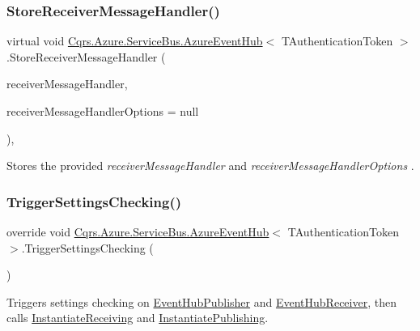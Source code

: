 \subsubsection{\texorpdfstring{Store\+Receiver\+Message\+Handler()}{StoreReceiverMessageHandler()}}
{\footnotesize\ttfamily virtual void \hyperlink{classCqrs_1_1Azure_1_1ServiceBus_1_1AzureEventHub}{Cqrs.\+Azure.\+Service\+Bus.\+Azure\+Event\+Hub}$<$ T\+Authentication\+Token $>$.Store\+Receiver\+Message\+Handler (\begin{DoxyParamCaption}\item[{Action$<$ Partition\+Context, Event\+Data $>$}]{receiver\+Message\+Handler,  }\item[{Event\+Processor\+Options}]{receiver\+Message\+Handler\+Options = {\ttfamily null} }\end{DoxyParamCaption})\hspace{0.3cm}{\ttfamily [protected]}, {\ttfamily [virtual]}}



Stores the provided {\itshape receiver\+Message\+Handler}  and {\itshape receiver\+Message\+Handler\+Options} . 

\mbox{\label{classCqrs_1_1Azure_1_1ServiceBus_1_1AzureEventHub_a779ce1115cf00dfaf072056a6ad8f9fe_a779ce1115cf00dfaf072056a6ad8f9fe}} 
\subsubsection{\texorpdfstring{Trigger\+Settings\+Checking()}{TriggerSettingsChecking()}}
{\footnotesize\ttfamily override void \hyperlink{classCqrs_1_1Azure_1_1ServiceBus_1_1AzureEventHub}{Cqrs.\+Azure.\+Service\+Bus.\+Azure\+Event\+Hub}$<$ T\+Authentication\+Token $>$.Trigger\+Settings\+Checking (\begin{DoxyParamCaption}{ }\end{DoxyParamCaption})\hspace{0.3cm}{\ttfamily [protected]}}



Triggers settings checking on \hyperlink{classCqrs_1_1Azure_1_1ServiceBus_1_1AzureEventHub_a5f64ce36efaee0f676816c803620d05e_a5f64ce36efaee0f676816c803620d05e}{Event\+Hub\+Publisher} and \hyperlink{classCqrs_1_1Azure_1_1ServiceBus_1_1AzureEventHub_a1b12b47dbb9b9afe2014477a2e457c35_a1b12b47dbb9b9afe2014477a2e457c35}{Event\+Hub\+Receiver}, then calls \hyperlink{classCqrs_1_1Azure_1_1ServiceBus_1_1AzureEventHub_aa725781eddb65bdfe456a4fecb36fb6b_aa725781eddb65bdfe456a4fecb36fb6b}{Instantiate\+Receiving} and \hyperlink{classCqrs_1_1Azure_1_1ServiceBus_1_1AzureEventHub_a3747fb9fcb3de2a72c8a6d7bbd92db95_a3747fb9fcb3de2a72c8a6d7bbd92db95}{Instantiate\+Publishing}. 

